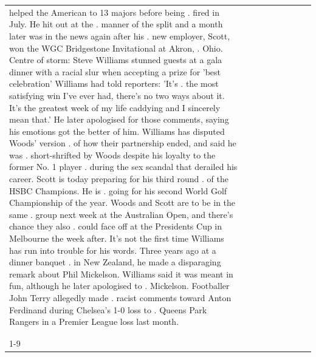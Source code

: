 \begin{table}[H]
\begin{tabular}{lllrlllll}
helped the American to 13 majors before being . fired in July. He hit out at the . manner of the split and a month later was in the news again after his . new employer, Scott, won the WGC Bridgestone Invitational at Akron, . Ohio. Centre of storm: Steve Williams stunned guests at a gala dinner with a racial slur when accepting a prize for 'best celebration' Williams had told reporters: 'It's . the most satisfying win I've ever had, there's no two ways about it. It's the greatest week of my life caddying and I sincerely mean that.' He later apologised for those comments, saying his emotions got the better of him. Williams has disputed Woods' version . of how their partnership ended, and said he was . short-shrifted by Woods despite his loyalty to the former No. 1 player . during the sex scandal that derailed his career. Scott is today preparing for his third round . of the HSBC Champions. He is . going for his second World Golf Championship of the year. Woods and Scott are to be in the same . group next week at the Australian Open, and there's chance they also . could face off at the Presidents Cup in Melbourne the week after. It's not the first time Williams has run into trouble for his words. Three years ago at a dinner banquet . in New Zealand, he made a disparaging remark about Phil Mickelson. Williams said it was meant in fun, although he later apologised to . Mickelson. Footballer John Terry allegedly made . racist comments toward Anton Ferdinand during Chelsea's 1-0 loss to . Queens Park Rangers in a Premier League loss last month.\\\\ \\
\cline{1-9}

\end{tabular}
\end{table}
